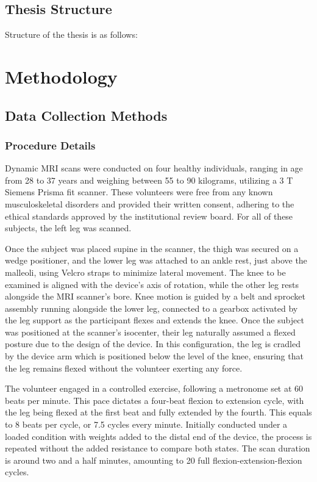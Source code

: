 \documentclass{micro-econ-thesis}
\begin{document}
\subsection{Thesis Structure}
Structure of the thesis is as follows: 


\section{Methodology}
\label{sec:second}

\subsection{Data Collection Methods}

\subsubsection{Procedure Details}
Dynamic MRI scans were conducted on four healthy individuals, ranging in age from 28 to 37 years and weighing between 55 to 90 kilograms, utilizing a 3 T Siemens Prisma fit scanner. These volunteers were free from any known musculoskeletal disorders and provided their written consent, adhering to the ethical standards approved by the institutional review board. For all of these subjects, the left leg was scanned. 


Once the subject was placed supine in the scanner, the thigh was secured on a wedge positioner, and the lower leg was attached to an ankle rest, just above the malleoli, using Velcro straps to minimize lateral movement. The knee to be examined is aligned with the device’s axis of rotation, while the other leg rests alongside the MRI scanner's bore.  Knee motion is guided by a belt and sprocket assembly running alongside the lower leg, connected to a gearbox activated by the leg support as the participant flexes and extends the knee. Once the subject was positioned at the scanner's isocenter, their leg naturally assumed a flexed posture due to the design of the device. In this configuration, the leg is cradled by the device arm which is positioned below the level of the knee, ensuring that the leg remains flexed without the volunteer exerting any force.


The volunteer engaged in a controlled exercise, following a metronome set at 60 beats per minute. This pace dictates a four-beat flexion to extension cycle, with the leg being flexed at the first beat and fully extended by the fourth. This equals to 8 beats per cycle, or 7.5 cycles every minute. Initially conducted under a loaded condition with weights added to the distal end of the device, the process is repeated without the added resistance to compare both states. The scan duration is around two and a half minutes, amounting to 20 full flexion-extension-flexion cycles. 
\end{document}
